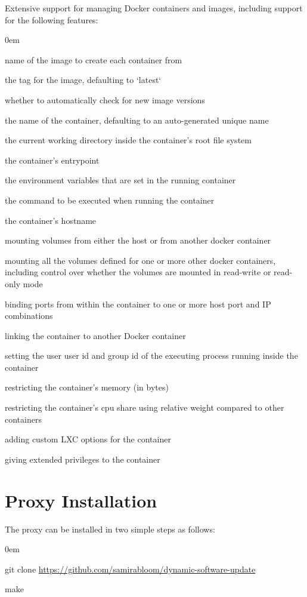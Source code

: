 \documentclass[a4paper,11pt,twoside]{report}
\begin{document}
Extensive support for managing Docker containers and images, including support for the following features:
	\begin{list}{-}{}
		\itemsep0em	
		\item name of the image to create each container from
		\item the tag for the image, defaulting to `latest`
		\item whether to automatically check for new image versions
		\item the name of the container, defaulting to an auto-generated unique name
		\item the current working directory inside the container's root file system
		\item the container's entrypoint
		\item the environment variables that are set in the running container
		\item the command to be executed when running the container
		\item the container's hostname
		\item mounting volumes from either the host or from another docker container
		\item mounting all the volumes defined for one or more other docker containers, including control over whether the volumes are mounted in read-write or read-only mode
		\item binding ports from within the container to one or more host port and IP combinations
		\item linking the container to another Docker container
		\item setting the user user id and group id of the executing process running inside the container
		\item restricting the container's memory (in bytes)
		\item restricting the container's cpu share using relative weight compared to other containers
		\item adding custom LXC options for the container
		\item giving extended privileges to the container
	\end{list}

\section{Proxy Installation}
The proxy can be installed in two simple steps as follows:
\begin{list}{-}{}
  \itemsep0em
  \item git clone \url {https://github.com/samirabloom/dynamic-software-update} 
  \item make
\end{list}
\end{document}
